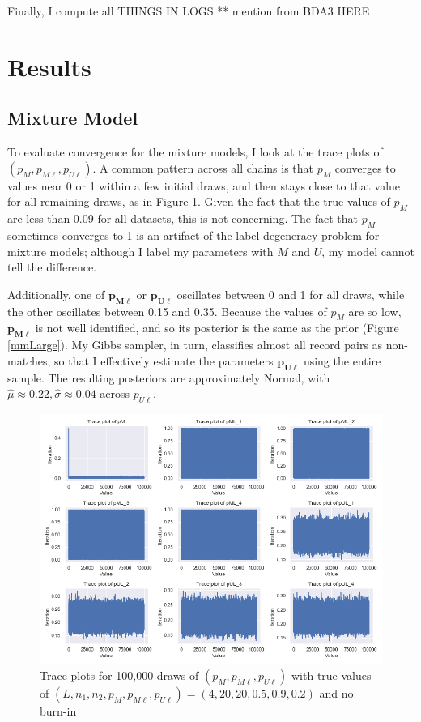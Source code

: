 \documentclass[11pt,reqno]{amsart}
\newcommand\params{(p_M, p_{M\ell}, p_{U\ell})}
\newcommand\longparam{(L,n_1,n_2, p_M,p_{M\ell},p_{U\ell})}
\begin{document}
Finally, I compute all THINGS IN LOGS ** mention from BDA3 HERE

\section{Results}

\subsection{Mixture Model} 
To evaluate convergence for the mixture models, I look at the trace plots of $\params$.  A common pattern across all chains is that $p_M$ converges to values near 0 or 1 within a few initial draws, and then stays close to that value for all remaining draws, as in Figure \ref{mmConverge}.  Given the fact that the true values of $p_M$ are less than 0.09 for all datasets, this is not concerning.  The fact that $p_M$ sometimes converges to 1 is an artifact of the label degeneracy problem for mixture models; although I label my parameters with $M$ and $U$, my model cannot tell the difference.

Additionally, one of $\mathbf{p_{M\ell}}$ or $\mathbf{p_{U\ell}}$ oscillates between 0 and 1 for all draws, while the other oscillates between 0.15 and 0.35.  Because the values of $p_M$ are so low, $\mathbf{p_{M\ell}}$ is not well identified, and so its posterior is the same as the prior (Figure \ref{mmLarge}).  My Gibbs sampler, in turn, classifies almost all record pairs as non-matches, so that I effectively estimate the parameters $\mathbf{p_{U\ell}}$ using the entire sample. The resulting posteriors are approximately Normal, with $\hat{\mu} \approx 0.22,  \hat{\sigma} \approx 0.04$ across $p_{U\ell}$.
 
\begin{figure}[htbp]
\begin{center}
\includegraphics[width=\textwidth]{../Figures/mm/nM10/allTrace_nM10_L4.png}
\caption{Trace plots for 100,000 draws of $\params$ with true values of $\longparam = (4,20,20,0.5,0.9,0.2)$ and no burn-in}
\label{mmConverge}
\end{center}
\end{figure}
\end{document}
